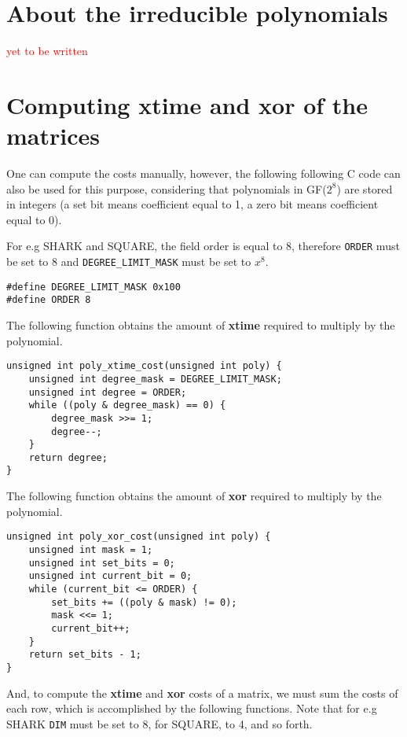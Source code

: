 \documentclass{report}
\begin{document}
\section{About the irreducible polynomials}
\textcolor{red}{yet to be written}

\section{Computing \textbf{xtime} and \textbf{xor} of the matrices}

One can compute the costs manually, however, the following following C code can also be used for this purpose, considering that polynomials in GF($2^8$) are stored in integers (a set bit means coefficient equal to 1, a zero bit means coefficient equal to 0).

For e.g SHARK and SQUARE, the field order is equal to 8, therefore \texttt{ORDER} must be set to 8 and \texttt{DEGREE_LIMIT_MASK} must be set to $x^8$.

\begin{verbatim}
#define DEGREE_LIMIT_MASK 0x100
#define ORDER 8
\end{verbatim}

The following function obtains the amount of \textbf{xtime} required to multiply by the polynomial.

\begin{verbatim}
unsigned int poly_xtime_cost(unsigned int poly) {
	unsigned int degree_mask = DEGREE_LIMIT_MASK;
	unsigned int degree = ORDER;
	while ((poly & degree_mask) == 0) {
		degree_mask >>= 1;
		degree--;
	}
	return degree;
}
\end{verbatim}

The following function obtains the amount of \textbf{xor} required to multiply by the polynomial.
\begin{verbatim}
unsigned int poly_xor_cost(unsigned int poly) {
	unsigned int mask = 1;
	unsigned int set_bits = 0;
	unsigned int current_bit = 0;
	while (current_bit <= ORDER) {
		set_bits += ((poly & mask) != 0);
		mask <<= 1;
		current_bit++;
	}
	return set_bits - 1;
}
\end{verbatim}

And, to compute the \textbf{xtime} and \textbf{xor} costs of a matrix, we must sum the costs of each row, which is accomplished by the following functions. Note that for e.g SHARK \texttt{DIM} must be set to 8, for SQUARE, to 4, and so forth.
\end{document}
